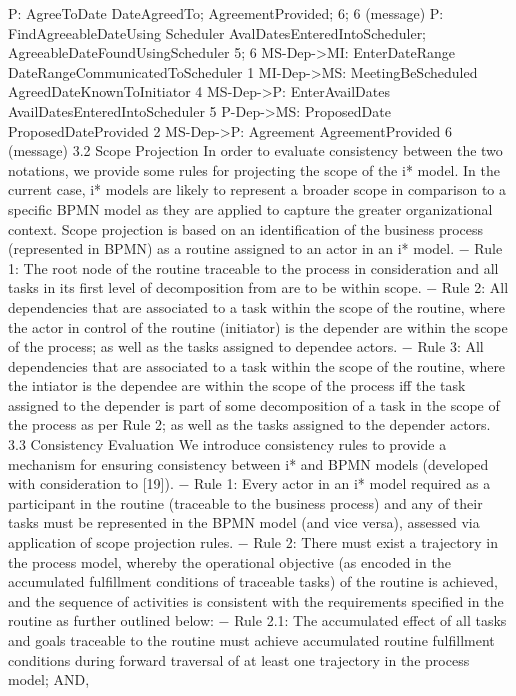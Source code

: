 P: AgreeToDate DateAgreedTo; AgreementProvided; 6; 6 (message)
P: FindAgreeableDateUsing Scheduler
AvalDatesEnteredIntoScheduler;
AgreeableDateFoundUsingScheduler
5;
6
MS-Dep->MI: EnterDateRange DateRangeCommunicatedToScheduler 1
MI-Dep->MS: MeetingBeScheduled AgreedDateKnownToInitiator 4
MS-Dep->P: EnterAvailDates AvailDatesEnteredIntoScheduler 5
P-Dep->MS: ProposedDate ProposedDateProvided 2
MS-Dep->P: Agreement AgreementProvided 6 (message)
3.2 Scope Projection
In order to evaluate consistency between the two notations, we provide some rules for
projecting the scope of the i* model. In the current case, i* models are likely to represent a broader scope in comparison to a specific BPMN model as they are applied to
capture the greater organizational context. Scope projection is based on an identification of the business process (represented in BPMN) as a routine assigned to an actor
in an i* model.
− Rule 1: The root node of the routine traceable to the process in consideration and
all tasks in its first level of decomposition from are to be within scope.
− Rule 2: All dependencies that are associated to a task within the scope of the routine, where the actor in control of the routine (initiator) is the depender are within
the scope of the process; as well as the tasks assigned to dependee actors.
− Rule 3: All dependencies that are associated to a task within the scope of the routine, where the intiator is the dependee are within the scope of the process iff the
task assigned to the depender is part of some decomposition of a task in the scope
of the process as per Rule 2; as well as the tasks assigned to the depender actors.
3.3 Consistency Evaluation
We introduce consistency rules to provide a mechanism for ensuring consistency
between i* and BPMN models (developed with consideration to [19]).
− Rule 1: Every actor in an i* model required as a participant in the routine (traceable to the business process) and any of their tasks must be represented in the
BPMN model (and vice versa), assessed via application of scope projection rules.
− Rule 2: There must exist a trajectory in the process model, whereby the operational
objective (as encoded in the accumulated fulfillment conditions of traceable tasks)
of the routine is achieved, and the sequence of activities is consistent with the requirements specified in the routine as further outlined below:
− Rule 2.1: The accumulated effect of all tasks and goals traceable to the routine
must achieve accumulated routine fulfillment conditions during forward traversal of at least one trajectory in the process model; AND,

